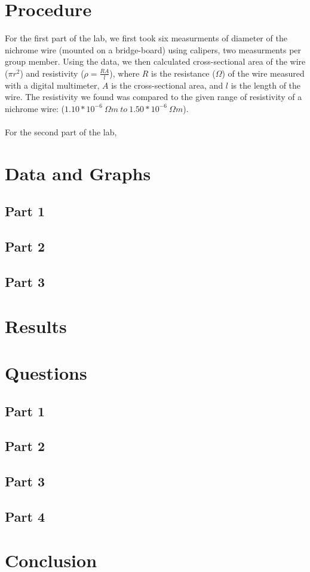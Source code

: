 \documentclass[titlepage]{article}
\begin{document}
	\section{Procedure}
	For the first part of the lab, we first took six measurments of diameter 
	of the nichrome wire (mounted on a bridge-board) using calipers, two measurments per group member.
	Using the data, we then calculated cross-sectional area of the wire ($\pi r^2$) and resistivity 
	($\rho = \frac{RA}{l}$), where $R$ is the resistance ($\Omega$) of the wire measured with a 
	digital multimeter, $A$ is the cross-sectional area, and $l$ is the length of the wire.  
	The resistivity we found was compared to the given range of resistivity of a 
	nichrome wire: ($1.10*10^{-6}~\Omega m~to~1.50*10^{-6}~\Omega m$). \\
	~\\  
	For the second part of the lab,



	\section{Data and Graphs}
	\subsection{Part 1}
	\subsection{Part 2} 
	\subsection{Part 3}
	\section{Results}
	\section{Questions}


	\subsection{Part 1}

	\subsection{Part 2}

    \subsection{Part 3}
	
    \subsection{Part 4}

	\section{Conclusion}
\end{document}

